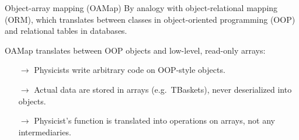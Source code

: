 \documentclass[aspectratio=169]{beamer}
\begin{document}
\begin{frame}{Object-array mapping (OAMap)}
\vspace{0.5 cm}
By analogy with object-relational mapping (ORM), which translates between classes in object-oriented programming (OOP) and relational tables in databases.

\vspace{0.5 cm}
OAMap translates between OOP objects and low-level, read-only arrays:

\vspace{0.2 cm}
\begin{itemize}
\item[$\rightarrow$] Physicists write arbitrary code on OOP-style objects.
\item[$\rightarrow$] Actual data are stored in arrays (e.g.~TBaskets), never deserialized into objects.
\item[$\rightarrow$] Physicist's function is translated into operations on arrays, not any intermediaries.
\end{itemize}

\vspace{0.2 cm}

\vspace{0.2 cm}
\end{frame}
\end{document}
